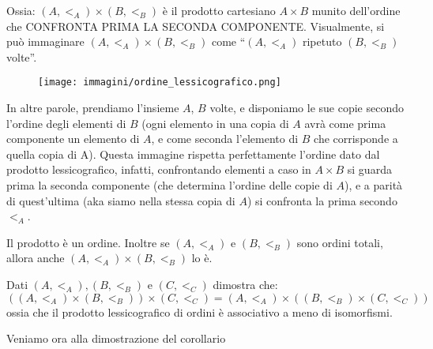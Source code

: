 \documentclass[11pt]{scrartcl}
\begin{document}
Ossia: $(A,<_A) \times (B,<_B)$ è il prodotto cartesiano $A \times B$ munito dell'ordine che CONFRONTA PRIMA LA SECONDA COMPONENTE.
Visualmente, si può immaginare $(A,<_A) \times (B,<_B)$ come ``$(A,<_A)$ ripetuto $(B,<_B)$ volte''.

\begin{figure}[h]
	\centering
	\texttt{[image: immagini/ordine\_lessicografico.png]}
\end{figure}

In altre parole, prendiamo l'insieme $A$, $B$ volte, e disponiamo le sue copie secondo l'ordine degli elementi di $B$ (ogni elemento in una copia di $A$ avrà come prima componente un elemento di $A$, 
e come seconda l'elemento di $B$ che corrisponde a quella copia di A). Questa immagine rispetta perfettamente l'ordine dato dal prodotto lessicografico, infatti, confrontando elementi a caso in $A \times B$ si guarda
prima la seconda componente (che determina l'ordine delle copie di $A$), e a parità di quest'ultima (aka siamo nella stessa copia di $A$) si confronta la prima secondo $<_A$.

\begin{remark}
	Il prodotto è un ordine. Inoltre se $(A, <_A)$ e $(B,<_B)$ sono ordini totali, allora anche 
	$(A,<_A) \times (B,<_B)$ lo è.
\end{remark}

\begin{exercise}
	Dati $(A,<_A),(B,<_B)$ e $(C,<_C)$ dimostra che:
	\[ ((A,<_A) \times (B,<_B)) \times (C,<_C) = (A,<_A) \times ((B,<_B) \times (C,<_C))
		\]
	ossia che il prodotto lessicografico di ordini è associativo a meno di isomorfismi.
\end{exercise}

Veniamo ora alla dimostrazione del corollario
\end{document}
